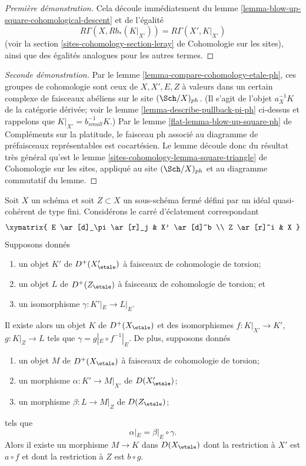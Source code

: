 \begin{proof}[Première démonstration]
Cela découle immédiatement du
lemme \ref{lemma-blow-up-square-cohomological-descent}
et de l'égalité
$$
R\Gamma(X, Rb_*(K|_{X'})) = R\Gamma(X', K|_{X'})
$$
(voir la section \ref{sites-cohomology-section-leray} de Cohomologie sur les sites),
ainsi que des égalités analogues pour les autres termes.
\end{proof}

\begin{proof}[Seconde démonstration]
Par le lemme \ref{lemma-compare-cohomology-etale-ph},
ces groupes de cohomologie sont ceux de
$X, X', E, Z$ à valeurs dans un certain complexe de faisceaux abéliens
sur le site $(\Sch/X)_{ph}$. (Il s'agit de l'objet
$a_X^{-1}K$ de la catégorie dérivée; voir le
lemme \ref{lemma-describe-pullback-pi-ph} ci-dessus
et rappelons que $K|_{X'} = b_{small}^{-1}K$.)
Par le lemme \ref{flat-lemma-blow-up-square-ph} de Compléments sur la platitude,
le faisceau ph associé au diagramme de préfaisceaux
représentables est cocartésien. Le lemme découle donc du résultat très général qu'est le
lemme \ref{sites-cohomology-lemma-square-triangle} de Cohomologie sur les sites,
appliqué au site $(\Sch/X)_{ph}$ et au diagramme commutatif
du lemme.
\end{proof}

\begin{lemma}
\label{lemma-blow-up-square-equivalence}
Soit $X$ un schéma et soit $Z \subset X$ un sous-schéma fermé
défini par un idéal quasi-cohérent de type fini. Considérons le
carré d'éclatement correspondant
$$
\xymatrix{
E \ar[d]_\pi \ar[r]_j & X' \ar[d]^b \\
Z \ar[r]^i & X
}
$$
Supposons donnés
\begin{enumerate}
\item un objet $K'$ de $D^+(X'_\etale)$ à faisceaux de cohomologie de torsion;
\item un objet $L$ de $D^+(Z_\etale)$ à faisceaux de cohomologie de torsion; et
\item un isomorphisme $\gamma : K'|_E \to L|_E$.
\end{enumerate}
Il existe alors un objet $K$ de $D^+(X_\etale)$
et des isomorphismes $f : K|_{X'} \to K'$, $g : K|_Z \to L$ tels
que $\gamma = g|_E \circ f^{-1}|_E$.
De plus, supposons donnés
\begin{enumerate}
\item un objet $M$ de $D^+(X_\etale)$ à faisceaux de cohomologie de torsion;
\item un morphisme $\alpha : K' \to M|_{X'}$ de $D(X'_\etale)$;
\item un morphisme $\beta : L \to M|_Z$ de $D(Z_\etale)$;
\end{enumerate}
tels que
$$
\alpha|_E  = \beta|_E \circ \gamma.
$$
Alors il existe un morphisme $M \to K$ dans $D(X_\etale)$
dont la restriction à $X'$ est $a \circ f$
et dont la restriction à $Z$ est $b \circ g$.
\end{lemma}

